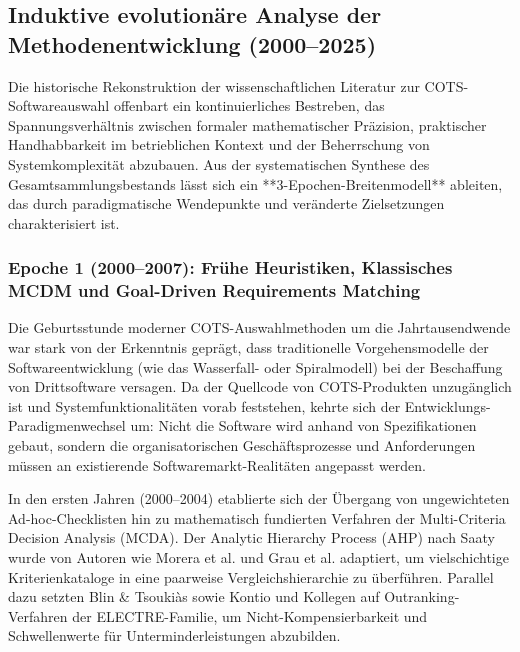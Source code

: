 \subsection{Induktive evolutionäre Analyse der Methodenentwicklung (2000--2025)}
\label{subsec:induktive_analyse}

Die historische Rekonstruktion der wissenschaftlichen Literatur zur COTS-Softwareauswahl offenbart ein kontinuierliches Bestreben, das Spannungsverhältnis zwischen formaler mathematischer Präzision, praktischer Handhabbarkeit im betrieblichen Kontext und der Beherrschung von Systemkomplexität abzubauen. Aus der systematischen Synthese des Gesamtsammlungsbestands lässt sich ein **3-Epochen-Breitenmodell** ableiten, das durch paradigmatische Wendepunkte und veränderte Zielsetzungen charakterisiert ist.

\subsubsection{Epoche 1 (2000--2007): Frühe Heuristiken, Klassisches MCDM und Goal-Driven Requirements Matching}

Die Geburtsstunde moderner COTS-Auswahlmethoden um die Jahrtausendwende war stark von der Erkenntnis geprägt, dass traditionelle Vorgehensmodelle der Softwareentwicklung (wie das Wasserfall- oder Spiralmodell) bei der Beschaffung von Drittsoftware versagen. Da der Quellcode von COTS-Produkten unzugänglich ist und Systemfunktionalitäten vorab feststehen, kehrte sich der Entwicklungs-Paradigmenwechsel um: Nicht die Software wird anhand von Spezifikationen gebaut, sondern die organisatorischen Geschäftsprozesse und Anforderungen müssen an existierende Softwaremarkt-Realitäten angepasst werden.

In den ersten Jahren (2000--2004) etablierte sich der Übergang von ungewichteten Ad-hoc-Checklisten hin zu mathematisch fundierten Verfahren der Multi-Criteria Decision Analysis (MCDA). Der Analytic Hierarchy Process (AHP) nach Saaty wurde von Autoren wie Morera et al. \cite{FCYW9EWJ} und Grau et al. \cite{DAU8NSK8} adaptiert, um vielschichtige Kriterienkataloge in eine paarweise Vergleichshierarchie zu überführen. Parallel dazu setzten Blin \& Tsoukiàs \cite{M3B2D3GD} sowie Kontio und Kollegen \cite{LZQJ6M4X} auf Outranking-Verfahren der ELECTRE-Familie, um Nicht-Kompensierbarkeit und Schwellenwerte für Unterminderleistungen abzubilden.

